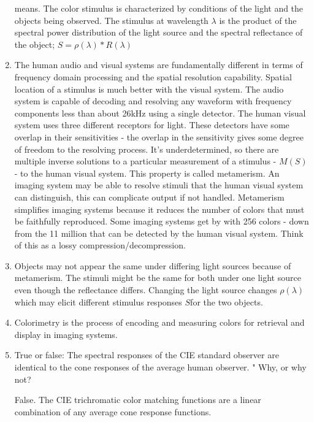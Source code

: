 \begin{enumerate}
means.  The color stimulus is characterized by conditions of the
light and the objects being observed.  The stimulus at wavelength
$\lambda$ is the product of the spectral power distribution of the
light source and the spectral reflectance of the object;
$S=\rho(\lambda)*R(\lambda)$ \item The human audio and visual
systems are fundamentally different in terms of frequency domain
processing and the spatial resolution capability. Spatial location
of a stimulus is much better with the visual system.  The audio
system is capable of decoding and resolving any waveform with
frequency components less than about 26kHz using a single
detector.  The human visual system uses three different receptors
for light. These detectors have some overlap in their
sensitivities - the overlap in the sensitivity gives some degree
of freedom to the resolving process. It's underdetermined, so
there are multiple inverse solutions to a particular measurement
of a stimulus - $M(S)$ - to the human visual system. This property
is called metamerism.  An imaging system may be able to resolve
stimuli that the human visual system can distinguish, this can
complicate output if not handled. Metamerism simplifies imaging
systems because it reduces the number of colors that must be
faithfully reproduced.  Some imaging systems get by with 256
colors - down from the 11 million that can be detected by the
human visual system.  Think of this as a lossy
compression/decompression. \item Objects may not appear the same
under differing light sources because of metamerism.  The stimuli
might be the same for both under one light source even though the
reflectance differs. Changing the light source changes
$\rho(\lambda)$ which may elicit different stimulus responses
$S$for the two objects. \item Colorimetry is the process of
encoding and measuring colors for retrieval and display in imaging
systems.

\item  True or false: The spectral responses of the CIE standard
observer are identical to the cone responses of the average human
observer. "   Why, or why not? \par  False.  The CIE trichromatic
color matching functions are a linear combination of any average
cone response functions.


\end{enumerate}
